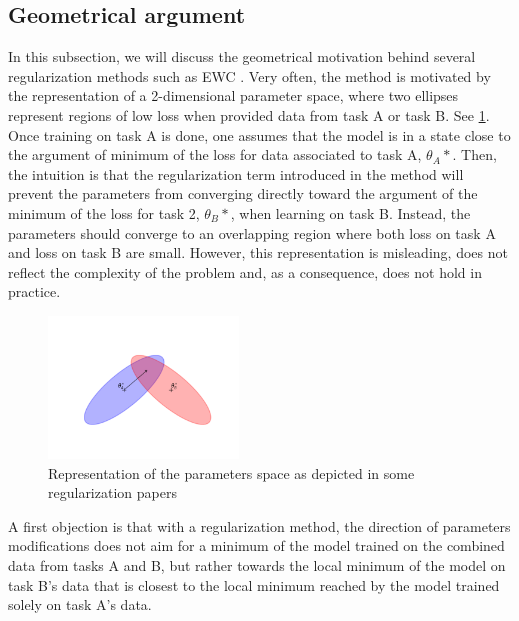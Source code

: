 \documentclass[11pt]{article}
\begin{document}
\subsection{Geometrical argument}


In this subsection, we will discuss the geometrical motivation behind several regularization methods such as EWC \cite{EWC_nuts_and_bolts}\cite{EWC_0}. Very often, the method is motivated by the representation of a 2-dimensional parameter space, where two ellipses represent regions of low loss when provided data from task A or task B. See \ref{fig:ellipses_EWC}. Once training on task A is done, one assumes that the model is in a state close to the argument of minimum of the loss for data associated to task A, $\theta_A*$. Then, the intuition is that the regularization term introduced in the method will prevent the parameters from converging directly toward the argument of the minimum of the loss for task 2, $\theta_B*$, when learning on task B. Instead, the parameters should converge to an overlapping region where both loss on task A and loss on task B are small. However, this representation is misleading, does not reflect the complexity of the problem and, as a consequence, does not hold in practice. 

\begin{figure}
    \centering
    \includegraphics[width=0.45\textwidth]{images/ellipse_overlap.png}
    \caption{Representation of the parameters space as depicted in some regularization papers \cite{EWC_0}\cite{EWC_nuts_and_bolts}}
    \label{fig:ellipses_EWC}
\end{figure}

\vspace{2mm}
\noindent
A first objection is that with a regularization method, the direction of parameters modifications does not aim for a minimum of the model trained on the combined data from tasks A and B, but rather towards the local minimum of the model on task B's data that is closest to the local minimum reached by the model trained solely on task A's data.
\end{document}
